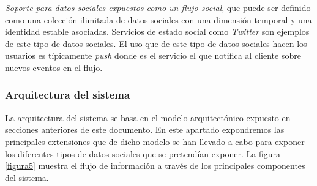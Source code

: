 \begin{itemize}
\textit{Soporte para datos sociales expuestos como un flujo social}, que puede ser definido como una colecci\'on ilimitada de datos sociales con una dimensi\'on temporal y una identidad estable asociadas. Servicios de estado social como \textit{Twitter} son ejemplos de este tipo de datos sociales. El uso que de este tipo de datos sociales hacen los usuarios es t\'ipicamente \textit{push} donde es el servicio el que notifica al cliente sobre nuevos eventos en el flujo. 
\end{itemize}

\subsubsection{Arquitectura del sistema}

La arquitectura del sistema se basa en el modelo arquitect\'onico expuesto en secciones anteriores de este documento. En este apartado expondremos las principales extensiones que de dicho modelo se han llevado a cabo para exponer los diferentes tipos de datos sociales que se pretend\'ian exponer. La figura \ref{figura5} muestra el flujo de informaci\'on a trav\'es de los principales componentes del sistema.\\

